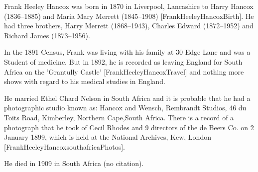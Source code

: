 
Frank Heeley Hancox was born in 1870 in Liverpool, Lancashire to Harry Hancox (1836--1885) and Maria Mary Merrett (1845--1908) [FrankHeeleyHancoxBirth]. He had three brothers, Harry Merrett (1868--1943), Charles Edward (1872--1952) and Richard James (1873--1956).

In the 1891 Census, Frank was living with his family at 30 Edge Lane and was a Student of medicine.\cite{FrankHeeleyHancoxResidenceUK}  But in 1892, he is recorded as leaving England for South Africa on the 'Grantully Castle' [FrankHeeleyHancoxTravel] and nothing more shows with regard to his medical studies in England. 

He married Ethel Chard Nelson in South Africa and it is probable that he had a photographic studio known as: Hancox and Wensch, Rembrandt Studios, 46 du Toits Road, Kimberley, Northern Cape,South Africa. There is a record of a photograph that he took of Cecil Rhodes and 9 directors of the de Beers Co. on 2 January 1899, which is held at the National Archives, Kew, London  [FrankHeeleyHancoxsouthafricaPhotos].

He died in 1909 in South Africa (no citation).
